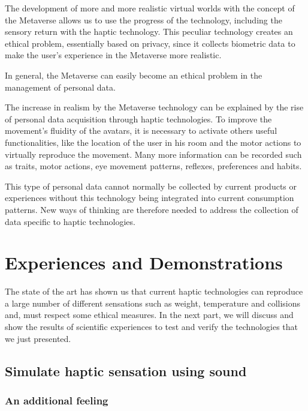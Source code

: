 \documentclass[12pt, a4paper]{article}
\begin{document}
\begin{multicols}{2}
\par The development of more and more realistic virtual worlds with the concept of the Metaverse allows us to use the progress of the technology, including the sensory return with the haptic technology. This peculiar technology creates an ethical problem, essentially based on privacy, since it collects biometric data to make the user's experience in the Metaverse more realistic\cite{ethics}.
\par In general, the Metaverse can easily become an ethical problem in the management of personal data.
\par The increase in realism by the Metaverse technology can be explained by the rise of personal data acquisition through haptic technologies. To improve the movement's fluidity of the avatars, it is necessary to activate others useful functionalities, like the location of the user in his room and the motor actions to virtually reproduce the movement. Many more information can be recorded such as traits, motor actions, eye movement patterns, reflexes, preferences and habits\cite{ethics}.
\par This type of personal data cannot normally be collected by current products or experiences without this technology being integrated into current consumption patterns. New ways of thinking are therefore needed to address the collection of data specific to haptic technologies\cite{ethics}.

\section{Experiences and Demonstrations}

The state of the art has shown us that current haptic technologies can reproduce a large number of different sensations such as weight, temperature and collisions and, must respect some ethical measures. In the next part, we will discuss and show the results of scientific experiences to test and verify the technologies that we just presented.

\subsection{Simulate haptic sensation using sound}

\subsubsection{An additional feeling}


\end{multicols}
\end{document}
